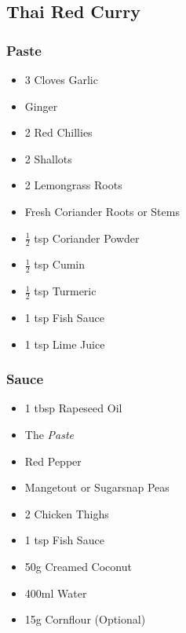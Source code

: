 \documentclass[11pt, english]{article}
\begin{document}
\newpage

	\subsection{Thai Red Curry}

		\subsubsection*{Paste}

	\begin{itemize}
        \setlength\itemsep{0cm}
		\item 3 Cloves Garlic
                \item Ginger
                \item 2 Red Chillies
                \item 2 Shallots
                \item 2 Lemongrass Roots
                \item Fresh Coriander Roots or Stems
		\item $\frac{1}{2}$ tsp Coriander Powder
                \item $\frac{1}{2}$ tsp Cumin
		\item $\frac{1}{2}$ tsp Turmeric
                \item 1 tsp Fish Sauce
                \item 1 tsp Lime Juice
        \end{itemize}

		\subsubsection*{Sauce}

	\begin{itemize}
        \setlength\itemsep{0cm}
                \item 1 tbsp Rapeseed Oil
                \item The \textit{Paste}
                \item Red Pepper
		\item Mangetout or Sugarsnap Peas
                \item 2 Chicken Thighs
                \item 1 tsp Fish Sauce
                \item 50g Creamed Coconut
		\item 400ml Water
		\item 15g Cornflour (Optional)
        \end{itemize}
\end{document}
